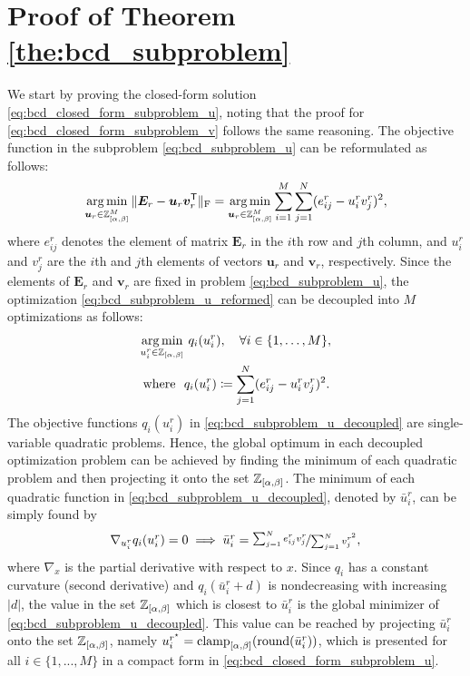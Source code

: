 \section{Proof of Theorem \ref{the:bcd_subproblem}} \label{app:monotonicity_proof}

We start by proving the closed-form solution \eqref{eq:bcd_closed_form_subproblem_u}, noting that the proof for \eqref{eq:bcd_closed_form_subproblem_v} follows the same reasoning.
The objective function in the subproblem \eqref{eq:bcd_subproblem_u} can be reformulated as follows:
\begin{align}
    \operatorname*{arg\,min}_{\bm{u}_r \in \mathbb{Z}_{[\alpha,\beta]}^M} \|\bm{E}_r - \bm{u}_r \bm{v}_r^\mathsf{T}\|_{\rm F}
    = \operatorname*{arg\,min}_{\bm{u}_r \in \mathbb{Z}_{[\alpha,\beta]}^M}\sum_{i=1}^M \sum_{j=1}^N (e_{ij}^r - u_i^r v_j^r)^2,
    \label{eq:bcd_subproblem_u_reformed}
\end{align}
where $e_{ij}^r$ denotes the element of matrix $\bm{E}_r$ in the $i$th row and $j$th column, and $u_i^r$ and $v_j^r$ are the $i$th and $j$th elements of vectors $\bm{u}_r$ and $\bm{v}_r$, respectively. Since the elements of $\bm{E}_r$ and $\bm{v}_r$ are fixed in problem \eqref{eq:bcd_subproblem_u}, the optimization \eqref{eq:bcd_subproblem_u_reformed} can be decoupled into $M$ optimizations as follows:
\begin{align}
    \operatorname*{arg\,min}_{u^r_i \in \mathbb{Z}_{[\alpha,\beta]}} & ~q_i(u_i^r), \quad \forall i\in\{1,\dots,M\}, \nonumber       \\
    \textstyle \text{where} ~~              & q_i(u_i^r) \coloneqq \sum_{j=1}^N (e_{ij}^r - u_i^r v_j^r)^2.
    \label{eq:bcd_subproblem_u_decoupled}
\end{align}
The objective functions $q_i(u_i^r)$ in \eqref{eq:bcd_subproblem_u_decoupled} are single-variable quadratic problems. Hence, the global optimum in each decoupled optimization problem can be achieved by finding the minimum of each quadratic problem and then projecting it onto the set $\mathbb{Z}_{[\alpha,\beta]}$. The minimum of each quadratic function in \eqref{eq:bcd_subproblem_u_decoupled}, denoted by $\bar{u}_i^r$, can be simply found by
\begin{align}
    \textstyle \nabla_{u_i^r} q_i(u_i^r) = 0 \implies \bar{u}_i^r = \nicefrac{\sum_{j=1}^N e_{ij}^r v_j^r}{\sum_{j=1}^N v_j^{r^2}},
    \label{eq:bcd_subproblem_u_minimum}
\end{align}
where $\nabla_x$ is the partial derivative with respect to $x$.
Since $q_i$ has a constant curvature (second derivative) and $q_i(\bar{u}_i^r + d)$ is nondecreasing with increasing $|d|$, the value in the set $\mathbb{Z}_{[\alpha,\beta]}$ which is closest to $\bar{u}_i^r$ is the global minimizer of \eqref{eq:bcd_subproblem_u_decoupled}. This value can be reached by projecting $\bar{u}_i^r$ onto the set $\mathbb{Z}_{[\alpha,\beta]}$, namely $u^{r^\star}_i = \operatorname{clamp}_{[\alpha,\beta]}(\operatorname{round}(\bar{u}_i^r))$, which is presented for all $i\in\{1,...,M\}$ in a compact form in \eqref{eq:bcd_closed_form_subproblem_u}.

